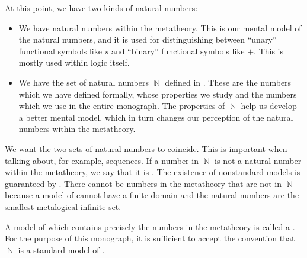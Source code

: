 \begin{remark}\label{rem:standard_models_of_arithmetic}
  At this point, we have two kinds of natural numbers:
  \begin{itemize}
    \item We have natural numbers within the metatheory. This is our mental model of the natural numbers, and it is used for distinguishing between \enquote{unary} functional symbols like \( s \) and \enquote{binary} functional symbols like \( + \). This is mostly used within logic itself.

    \item We have the set of natural numbers \( \BbbN \) defined in . These are the numbers which we have defined formally, whose properties we study and the numbers which we use in the entire monograph. The properties of \( \BbbN \) help us develop a better mental model, which in turn changes our perception of the natural numbers within the metatheory.
  \end{itemize}

  We want the two sets of natural numbers to coincide. This is important when talking about, for example, \hyperref[def:sequence]{sequences}. If a number in \( \BbbN \) is not a natural number within the metatheory, we say that it is . The existence of nonstandard models is guaranteed by . There cannot be numbers in the metatheory that are not in \( \BbbN \) because a model of  cannot have a finite domain and the natural numbers are the smallest metalogical infinite set.

  A model of  which contains precisely the numbers in the metatheory is called a . For the purpose of this monograph, it is sufficient to accept the convention that \( \BbbN \) is a standard model of .
\end{remark}

